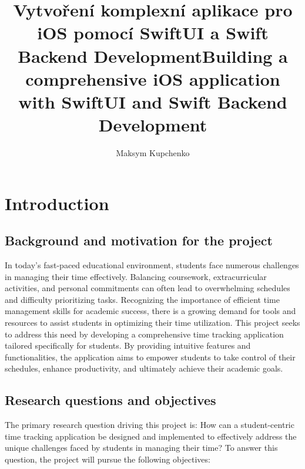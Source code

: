 \documentclass[
  biblatex,
  language=english,
  figures=false,
  sourcecodes,
  glossaries,
  index
]{kidiplom}
\title[czech]{Vytvoření komplexní aplikace pro iOS pomocí SwiftUI a Swift Backend Development}
\title[english]{Building a comprehensive iOS application with SwiftUI and Swift Backend Development}
\author{Maksym Kupchenko}
\begin{document}
\maketitle



\newcommand{\BibLaTeX}{\textsc{Bib}\LaTeX}

\section{Introduction}

\subsection{Background and motivation for the project}
In today's fast-paced educational environment, students face numerous challenges in managing their time effectively. Balancing coursework, extracurricular activities, and personal commitments can often lead to overwhelming schedules and difficulty prioritizing tasks. Recognizing the importance of efficient time management skills for academic success, there is a growing demand for tools and resources to assist students in optimizing their time utilization. This project seeks to address this need by developing a comprehensive time tracking application tailored specifically for students. By providing intuitive features and functionalities, the application aims to empower students to take control of their schedules, enhance productivity, and ultimately achieve their academic goals.

\subsection{Research questions and objectives}
The primary research question driving this project is: How can a student-centric time tracking application be designed and implemented to effectively address the unique challenges faced by students in managing their time? To answer this question, the project will pursue the following objectives:
\end{document}

